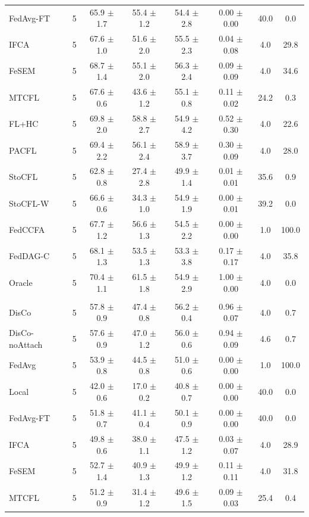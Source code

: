 {\begin{tabular}{l r c c c c c c}
FedAvg-FT & 5 & 65.9 $\pm$ 1.7 & 55.4 $\pm$ 1.2 & 54.4 $\pm$ 2.8 & 0.00 $\pm$ 0.00 & 40.0 & 0.0 \\
IFCA & 5 & 67.6 $\pm$ 1.0 & 51.6 $\pm$ 2.0 & 55.5 $\pm$ 2.3 & 0.04 $\pm$ 0.08 & 4.0 & 29.8 \\
FeSEM & 5 & 68.7 $\pm$ 1.4 & 55.1 $\pm$ 2.0 & 56.3 $\pm$ 2.4 & 0.09 $\pm$ 0.09 & 4.0 & 34.6 \\
MTCFL & 5 & 67.6 $\pm$ 0.6 & 43.6 $\pm$ 1.2 & 55.1 $\pm$ 0.8 & 0.11 $\pm$ 0.02 & 24.2 & 0.3 \\
FL+HC & 5 & 69.8 $\pm$ 2.0 & 58.8 $\pm$ 2.7 & 54.9 $\pm$ 4.2 & 0.52 $\pm$ 0.30 & 4.0 & 22.6 \\
PACFL & 5 & 69.4 $\pm$ 2.2 & 56.1 $\pm$ 2.4 & 58.9 $\pm$ 3.7 & 0.30 $\pm$ 0.09 & 4.0 & 28.0 \\
StoCFL & 5 & 62.8 $\pm$ 0.8 & 27.4 $\pm$ 2.8 & 49.9 $\pm$ 1.4 & 0.01 $\pm$ 0.01 & 35.6 & 0.9 \\
StoCFL-W & 5 & 66.6 $\pm$ 0.6 & 34.3 $\pm$ 1.0 & 54.9 $\pm$ 1.9 & 0.00 $\pm$ 0.01 & 39.2 & 0.0 \\
FedCCFA & 5 & 67.7 $\pm$ 1.2 & 56.6 $\pm$ 1.3 & 54.5 $\pm$ 2.2 & 0.00 $\pm$ 0.00 & 1.0 & 100.0 \\
FedDAG-C & 5 & 68.1 $\pm$ 1.3 & 53.5 $\pm$ 1.3 & 53.3 $\pm$ 3.8 & 0.17 $\pm$ 0.17 & 4.0 & 35.8 \\
Oracle & 5 & 70.4 $\pm$ 1.1 & 61.5 $\pm$ 1.8 & 54.9 $\pm$ 2.9 & 1.00 $\pm$ 0.00 & 4.0 & 0.0 \\
\addlinespace
\multicolumn{8}{l}{\textit{CIFAR-100 label swaps}} \\
DisCo & 5 & 57.8 $\pm$ 0.9 & 47.4 $\pm$ 0.8 & 56.2 $\pm$ 0.4 & 0.96 $\pm$ 0.07 & 4.0 & 0.7 \\
DisCo-noAttach & 5 & 57.6 $\pm$ 0.9 & 47.0 $\pm$ 1.2 & 56.0 $\pm$ 0.6 & 0.94 $\pm$ 0.09 & 4.6 & 0.7 \\
FedAvg & 5 & 53.9 $\pm$ 0.8 & 44.5 $\pm$ 0.8 & 51.0 $\pm$ 0.6 & 0.00 $\pm$ 0.00 & 1.0 & 100.0 \\
Local & 5 & 42.0 $\pm$ 0.6 & 17.0 $\pm$ 0.2 & 40.8 $\pm$ 0.7 & 0.00 $\pm$ 0.00 & 40.0 & 0.0 \\
FedAvg-FT & 5 & 51.8 $\pm$ 0.7 & 41.1 $\pm$ 0.4 & 50.1 $\pm$ 0.9 & 0.00 $\pm$ 0.00 & 40.0 & 0.0 \\
IFCA & 5 & 49.8 $\pm$ 0.6 & 38.0 $\pm$ 1.1 & 47.5 $\pm$ 1.2 & 0.03 $\pm$ 0.07 & 4.0 & 28.9 \\
FeSEM & 5 & 52.7 $\pm$ 1.4 & 40.9 $\pm$ 1.3 & 49.9 $\pm$ 1.2 & 0.11 $\pm$ 0.11 & 4.0 & 31.8 \\
MTCFL & 5 & 51.2 $\pm$ 0.9 & 31.4 $\pm$ 1.2 & 49.6 $\pm$ 1.5 & 0.09 $\pm$ 0.03 & 25.4 & 0.4 \\

\end{tabular}}
